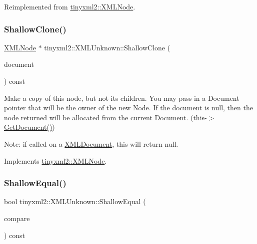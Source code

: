 Reimplemented from \hyperlink{classtinyxml2_1_1_x_m_l_node_a0afc27892998f31735f6225edb40a40d}{tinyxml2\+::\+X\+M\+L\+Node}.

\mbox{\label{classtinyxml2_1_1_x_m_l_unknown_ab73b48b819aa4b2ef3815dc2d7d20d5f}} 
\subsubsection{\texorpdfstring{Shallow\+Clone()}{ShallowClone()}}
{\footnotesize\ttfamily \hyperlink{classtinyxml2_1_1_x_m_l_node}{X\+M\+L\+Node} $\ast$ tinyxml2\+::\+X\+M\+L\+Unknown\+::\+Shallow\+Clone (\begin{DoxyParamCaption}\item[{\hyperlink{classtinyxml2_1_1_x_m_l_document}{X\+M\+L\+Document} $\ast$}]{document }\end{DoxyParamCaption}) const\hspace{0.3cm}{\ttfamily [virtual]}}

Make a copy of this node, but not its children. You may pass in a Document pointer that will be the owner of the new Node. If the \textquotesingle{}document\textquotesingle{} is null, then the node returned will be allocated from the current Document. (this-\/$>$\hyperlink{classtinyxml2_1_1_x_m_l_node_af343d1ef0b45c0020e62d784d7e67a68}{Get\+Document()})

Note\+: if called on a \hyperlink{classtinyxml2_1_1_x_m_l_document}{X\+M\+L\+Document}, this will return null. 

Implements \hyperlink{classtinyxml2_1_1_x_m_l_node_a8402cbd3129d20e9e6024bbcc0531283}{tinyxml2\+::\+X\+M\+L\+Node}.

\mbox{\label{classtinyxml2_1_1_x_m_l_unknown_ac46767cd721d666e690a6231dfb618d1}} 
\subsubsection{\texorpdfstring{Shallow\+Equal()}{ShallowEqual()}}
{\footnotesize\ttfamily bool tinyxml2\+::\+X\+M\+L\+Unknown\+::\+Shallow\+Equal (\begin{DoxyParamCaption}\item[{const \hyperlink{classtinyxml2_1_1_x_m_l_node}{X\+M\+L\+Node} $\ast$}]{compare }\end{DoxyParamCaption}) const\hspace{0.3cm}{\ttfamily [virtual]}}


